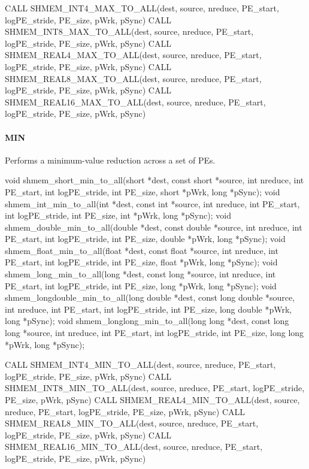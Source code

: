 \begin{apidefinition}
\begin{Fsynopsis}
CALL SHMEM_INT4_MAX_TO_ALL(dest, source, nreduce, PE_start, logPE_stride, PE_size, pWrk, pSync)
CALL SHMEM_INT8_MAX_TO_ALL(dest, source, nreduce, PE_start, logPE_stride, PE_size, pWrk, pSync)
CALL SHMEM_REAL4_MAX_TO_ALL(dest, source, nreduce, PE_start, logPE_stride, PE_size, pWrk, pSync)
CALL SHMEM_REAL8_MAX_TO_ALL(dest, source, nreduce, PE_start, logPE_stride, PE_size, pWrk, pSync)
CALL SHMEM_REAL16_MAX_TO_ALL(dest, source, nreduce, PE_start, logPE_stride, PE_size, pWrk, pSync)
\end{Fsynopsis}

\paragraph{MIN}
Performs a minimum-value reduction across a set of \acp{PE}.\newline
\begin{Csynopsis}
void shmem_short_min_to_all(short *dest, const short *source, int nreduce, int PE_start, int logPE_stride, int PE_size, short *pWrk, long *pSync);
void shmem_int_min_to_all(int *dest, const int *source, int nreduce, int PE_start, int logPE_stride, int PE_size, int *pWrk, long *pSync);
void shmem_double_min_to_all(double *dest, const double *source, int nreduce, int PE_start, int logPE_stride, int PE_size, double *pWrk, long *pSync);
void shmem_float_min_to_all(float *dest, const float *source, int nreduce, int PE_start, int logPE_stride, int PE_size, float *pWrk, long *pSync);
void shmem_long_min_to_all(long *dest, const long *source, int nreduce, int PE_start, int logPE_stride, int PE_size, long *pWrk, long *pSync);
void shmem_longdouble_min_to_all(long double *dest, const long double *source, int nreduce, int PE_start, int logPE_stride, int PE_size, long double *pWrk, long *pSync);
void shmem_longlong_min_to_all(long long *dest, const long long *source, int nreduce, int PE_start, int logPE_stride, int PE_size, long long *pWrk, long *pSync);
\end{Csynopsis}

\begin{Fsynopsis}
CALL SHMEM_INT4_MIN_TO_ALL(dest, source, nreduce, PE_start, logPE_stride, PE_size, pWrk, pSync)
CALL SHMEM_INT8_MIN_TO_ALL(dest, source, nreduce, PE_start, logPE_stride, PE_size, pWrk, pSync)
CALL SHMEM_REAL4_MIN_TO_ALL(dest, source, nreduce, PE_start, logPE_stride, PE_size, pWrk, pSync)
CALL SHMEM_REAL8_MIN_TO_ALL(dest, source, nreduce, PE_start, logPE_stride, PE_size, pWrk, pSync)
CALL SHMEM_REAL16_MIN_TO_ALL(dest, source, nreduce, PE_start, logPE_stride, PE_size, pWrk, pSync)
\end{Fsynopsis}


\end{apidefinition}

